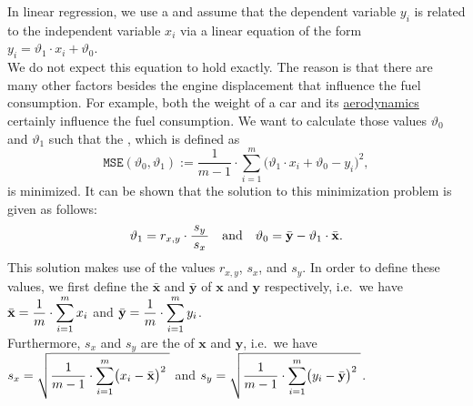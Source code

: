 In linear regression, we use a  
and assume that the dependent variable $y_i$ is related to the independent variable $x_i$ via a linear
equation of the form
\\[0.2cm]
\hspace*{1.3cm}
$y_i = \vartheta_1 \cdot x_i + \vartheta_0$.
\\[0.2cm]
We do not expect this equation to hold exactly.  The reason is that there are many other factors besides the
engine displacement that influence the fuel consumption.  For example, both the weight of a car and its 
\href{https://en.wikipedia.org/wiki/Automotive_aerodynamics}{aerodynamics} certainly influence the fuel consumption.  
We want to calculate those values $\vartheta_0$ and $\vartheta_1$ such that the 
,  which is defined as 
\begin{equation}
  \label{eq:mse}
 \mathtt{MSE}(\vartheta_0, \vartheta_1) := \frac{1}{m-1} \cdot \sum\limits_{i=1}^m \bigl(\vartheta_1 \cdot x_i + \vartheta_0 - y_i\bigr)^2,
\end{equation}
is minimized.  It can be shown that the solution to this minimization problem is given as follows:
\begin{equation}
  \label{eq:theta0}
  \displaystyle \vartheta_1 = r_{x,y} \cdot \frac{\,s_y\,}{s_x} \quad \mbox{and} \quad
      \vartheta_0 = \bar{\mathbf{y}} - \vartheta_1 \cdot \bar{\mathbf{x}}.
\end{equation}
This solution makes use of the values $r_{x,y}$, $s_x$, and $s_y$.  In order to define these values, we first
define the  
$\bar{\mathbf{x}}$ and $\bar{\mathbf{y}}$ of $\mathbf{x}$ and $\mathbf{y}$ respectively, i.e.~we have 
\\[0.2cm]
\hspace*{1.3cm}
$\displaystyle \bar{\mathbf{x}} = \frac{1}{m} \cdot \sum\limits_{i=1}^m x_i$ \quad and \quad
$\displaystyle \bar{\mathbf{y}} = \frac{1}{m} \cdot \sum\limits_{i=1}^m y_i$.
\\[0.2cm]
Furthermore, $s_x$ and $s_y$ are the  
of $\mathbf{x}$ and $\mathbf{y}$, i.e.~we have
\\[0.2cm]
\hspace*{1.3cm}
$\displaystyle s_x = \sqrt{\frac{1}{m-1} \cdot \sum\limits_{i=1}^m \bigl(x_i - \bar{\mathbf{x}}\bigr)^2\;}$ \quad and \quad
$\displaystyle s_y = \sqrt{\frac{1}{m-1} \cdot \sum\limits_{i=1}^m \bigl(y_i - \bar{\mathbf{y}}\bigr)^2\;}$.

